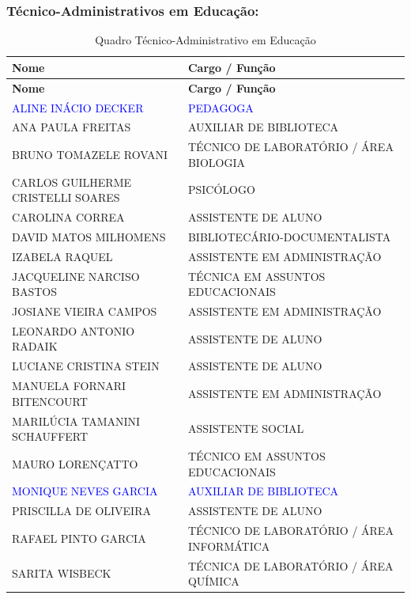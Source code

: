 \documentclass{../../modelos/latex-shared/ifsc-ppc}
\newcommand{\revisao}[1]{\textcolor{blue}{#1}}
\newcommand{\revisao}[1]{#1}
\newcommand{\semsumario}[1]{\addtocontents{toc}{\protect\setcounter{tocdepth}{2}}#1\addtocontents{toc}{\protect\setcounter{tocdepth}{4}}}
\begin{document}
\semsumario{\subsubsection{Técnico-Administrativos em Educação:}}
\begin{xltabular}{\linewidth}{|X|X|}
\caption{Quadro Técnico-Administrativo em Educação} \label{tab:taes} \\
\hline
{}
\textbf{Nome} & \textbf{Cargo / Função} \\ \hline
\endfirsthead
\hline
{}
\textbf{Nome} & \textbf{Cargo / Função} \\ \hline
\endhead
\revisao{ALINE INÁCIO DECKER} & \revisao{PEDAGOGA} \\ \hline
ANA PAULA FREITAS & AUXILIAR DE BIBLIOTECA \\ \hline
BRUNO TOMAZELE ROVANI & TÉCNICO DE LABORATÓRIO / ÁREA BIOLOGIA \\ \hline
CARLOS GUILHERME CRISTELLI SOARES & PSICÓLOGO \\ \hline
CAROLINA CORREA & ASSISTENTE DE ALUNO \\ \hline
DAVID MATOS MILHOMENS & BIBLIOTECÁRIO-DOCUMENTALISTA \\ \hline
IZABELA RAQUEL & ASSISTENTE EM ADMINISTRAÇÃO \\ \hline
JACQUELINE NARCISO BASTOS & TÉCNICA EM ASSUNTOS EDUCACIONAIS \\ \hline
JOSIANE VIEIRA CAMPOS & ASSISTENTE EM ADMINISTRAÇÃO \\ \hline
LEONARDO ANTONIO RADAIK & ASSISTENTE DE ALUNO \\ \hline
LUCIANE CRISTINA STEIN & ASSISTENTE DE ALUNO \\ \hline
MANUELA FORNARI BITENCOURT & ASSISTENTE EM ADMINISTRAÇÃO \\ \hline
MARILÚCIA TAMANINI SCHAUFFERT & ASSISTENTE SOCIAL \\ \hline
MAURO LORENÇATTO & TÉCNICO EM ASSUNTOS EDUCACIONAIS \\ \hline
\revisao{MONIQUE NEVES GARCIA} & \revisao{AUXILIAR DE BIBLIOTECA} \\ \hline
PRISCILLA DE OLIVEIRA & ASSISTENTE DE ALUNO \\ \hline
RAFAEL PINTO GARCIA & TÉCNICO DE LABORATÓRIO / ÁREA INFORMÁTICA \\ \hline
SARITA WISBECK & TÉCNICA DE LABORATÓRIO / ÁREA QUÍMICA \\ \hline
\end{xltabular}
\end{document}
